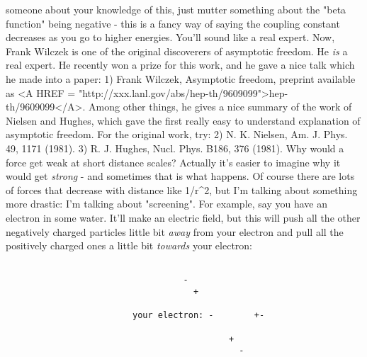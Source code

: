 someone about your knowledge of this, just mutter something about 
the "beta function" being negative - this is a fancy way of saying 
the coupling constant decreases as you go to higher energies.  You'll 
sound like a real expert.
Now, Frank Wilczek is one of the original discoverers of asymptotic
freedom.  He \emph{is} a real expert.  He recently won a prize for this work,
and he gave a nice talk which he made into a paper:
1) Frank Wilczek, Asymptotic freedom, preprint available as
<A HREF = "http://xxx.lanl.gov/abs/hep-th/9609099">hep-th/9609099</A>.
Among other things, he gives a nice summary of the work of Nielsen
and Hughes, which gave the first really easy to understand explanation
of asymptotic freedom.  For the original work, try:
2) N. K. Nielsen, Am. J. Phys. 49, 1171 (1981).
3) R. J. Hughes, Nucl. Phys. B186, 376 (1981). 
Why would a force get weak at short distance scales?  Actually it's
easier to imagine why it would get \emph{strong} - and sometimes that is
what happens.  Of course there are lots of forces that decrease with
distance like 1/r^2, but I'm talking about something more drastic: I'm
talking about "screening".
For example, say you have an electron in some water.  It'll make an
electric field, but this will push all the other negatively charged
particles little bit \emph{away} from your electron and pull all the
positively charged ones a little bit \emph{towards} your electron:

\begin{verbatim}

                                   -
                                     +

                         your electron: -        +-
 
                                            +
                                              -
                      
\end{verbatim}
    
